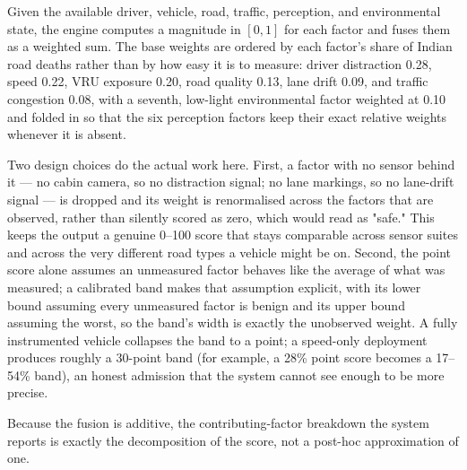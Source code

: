 \documentclass[journal]{IEEEtran}
\begin{document}
Given the available driver, vehicle, road, traffic, perception, and environmental state, the engine computes a magnitude in $[0,1]$ for each factor and fuses them as a weighted sum. The base weights are ordered by each factor's share of Indian road deaths rather than by how easy it is to measure: driver distraction 0.28, speed 0.22, VRU exposure 0.20, road quality 0.13, lane drift 0.09, and traffic congestion 0.08, with a seventh, low-light environmental factor weighted at 0.10 and folded in so that the six perception factors keep their exact relative weights whenever it is absent.

Two design choices do the actual work here. First, a factor with no sensor behind it — no cabin camera, so no distraction signal; no lane markings, so no lane-drift signal — is dropped and its weight is renormalised across the factors that are observed, rather than silently scored as zero, which would read as "safe." This keeps the output a genuine 0--100 score that stays comparable across sensor suites and across the very different road types a vehicle might be on. Second, the point score alone assumes an unmeasured factor behaves like the average of what was measured; a calibrated band makes that assumption explicit, with its lower bound assuming every unmeasured factor is benign and its upper bound assuming the worst, so the band's width is exactly the unobserved weight. A fully instrumented vehicle collapses the band to a point; a speed-only deployment produces roughly a 30-point band (for example, a 28\% point score becomes a 17--54\% band), an honest admission that the system cannot see enough to be more precise.

Because the fusion is additive, the contributing-factor breakdown the system reports is exactly the decomposition of the score, not a post-hoc approximation of one.
\end{document}
